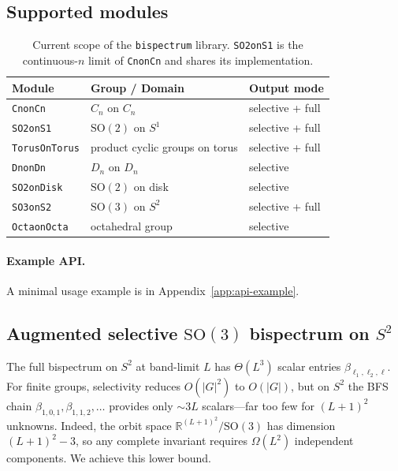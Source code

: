 \documentclass{article}
\theoremstyle{definition}
\theoremstyle{remark}
\newcommand{\R}{\mathbb{R}}
\newcommand{\SO}{\mathrm{SO}}
\theoremstyle{definition}
\begin{document}
\subsection{Supported modules}
\label{sec:supported-modules}

\begin{table}[t]
  \caption{Current scope of the \texttt{bispectrum} library.
    \texttt{SO2onS1} is the continuous-$n$ limit of \texttt{CnonCn}
    and shares its implementation.}
  \label{tab:supported-groups}
  \centering
  \small
  \begin{tabular}{lll}
    \toprule
    Module & Group / Domain & Output mode \\
    \midrule
    \texttt{CnonCn} & $C_n$ on $C_n$ & selective + full \\
    \texttt{SO2onS1} & $\SO(2)$ on $S^1$ & selective + full \\
    \texttt{TorusOnTorus} & product cyclic groups on torus & selective + full \\
    \texttt{DnonDn} & $D_n$ on $D_n$ & selective \\
    \texttt{SO2onDisk} & $\SO(2)$ on disk & selective \\
    \texttt{SO3onS2} & $\SO(3)$ on $S^2$ & selective + full \\
    \texttt{OctaonOcta} & octahedral group & selective \\
    \bottomrule
  \end{tabular}
\end{table}

\paragraph{Example API.}
\label{sec:api}
A minimal usage example is in Appendix~\ref{app:api-example}.

\subsection{Augmented selective $\SO(3)$ bispectrum on $S^2$}
\label{sec:so3-selective}

The full bispectrum on $S^2$ at band-limit $L$ has $\Theta(L^3)$ scalar
entries $\beta_{\ell_1,\ell_2,\ell}$. For finite groups, selectivity
reduces $O(|G|^2)$ to $O(|G|)$, but on $S^2$ the BFS chain
$\beta_{1,0,1}, \beta_{1,1,2}, \ldots$ provides only ${\sim}3L$
scalars---far too few for $(L{+}1)^2$ unknowns. Indeed, the orbit space
$\R^{(L+1)^2}/\SO(3)$ has dimension $(L{+}1)^2 - 3$, so any complete
invariant requires $\Omega(L^2)$ independent components. We achieve this
lower bound.
\end{document}
